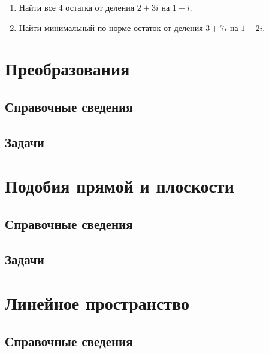 \begin{enumerate}
\item Найти все 4 остатка от деления $2+3i$ на $1+i$.
\item Найти минимальный по норме остаток от деления $3+7i$ на $1+2i$.
\end{enumerate}


\begin{comment}
\chapter{13. Введение в линейную алгебру}
\end{comment}
\label{linalg}


\section{Преобразования}

\subsection*{Справочные сведения}

\subsection*{Задачи}




\section{Подобия прямой и плоскости}


\subsection*{Справочные сведения}

\subsection*{Задачи}



\section{Линейное пространство}

\subsection*{Справочные сведения}

